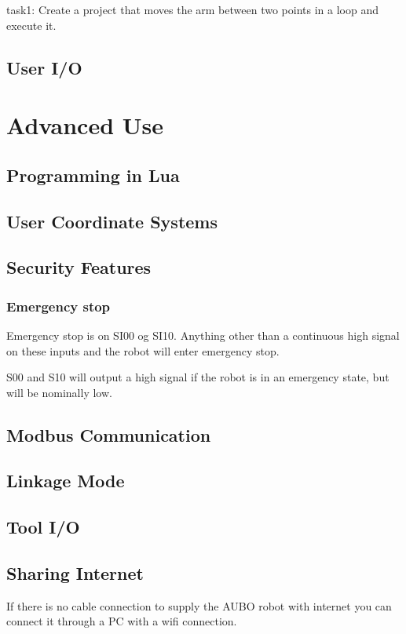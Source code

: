 \documentclass{article}
\begin{document}
task1: Create a project that moves the arm between two points in a loop and execute it. 

\subsection{User I/O}

\section{Advanced Use}
\subsection{Programming in Lua}
\subsection{User Coordinate Systems}
\subsection{Security Features}

\subsubsection{Emergency stop}
Emergency stop is on SI00 og SI10. Anything other than a continuous high signal on these inputs and the robot will enter emergency stop. 

S00 and S10 will output a high signal if the robot is in an emergency state, but will be nominally low. 



\subsection{Modbus Communication}
\subsection{Linkage Mode}
\subsection{Tool I/O}
\subsection{Sharing Internet}
If there is no cable connection to supply the AUBO robot with internet you can connect it through a PC with a wifi connection. 
\end{document}
